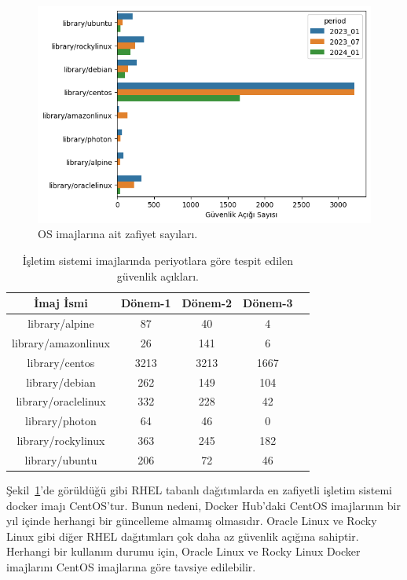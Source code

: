 \begin{figure}
    \centering
    \includegraphics[width=1\linewidth]{images/s2/os-images-by-period.png}
    \caption{OS imajlarına ait zafiyet sayıları.}\label{fig:os-images-by-period}
\end{figure}

\begin{table}
    \centering
    \begin{tabular}{ |c|c|c|c|c| }
        \hline
        İmaj İsmi & Dönem-1 & Dönem-2 & Dönem-3 \\
        \hline
        library/alpine      &   87 &   40 & 4 \\
        library/amazonlinux &   26 &  141 & 6 \\
        library/centos      & 3213 & 3213 & 1667 \\
        library/debian      &  262 &  149 & 104 \\
        library/oraclelinux &  332 &  228 & 42 \\
        library/photon      &   64 &   46 & 0 \\
        library/rockylinux  &  363 &  245 & 182 \\
        library/ubuntu      &  206 &   72 & 46 \\
        \hline
    \end{tabular}
    \caption{İşletim sistemi imajlarında periyotlara göre tespit edilen güvenlik açıkları.}\label{tab:os-images-by-period}
\end{table}

Şekil~\ref{fig:os-images-by-period}'de görüldüğü gibi RHEL tabanlı dağıtımlarda en zafiyetli işletim sistemi docker imajı CentOS'tur. Bunun nedeni, Docker Hub'daki CentOS imajlarının bir yıl içinde herhangi bir güncelleme almamış olmasıdır. Oracle Linux ve Rocky Linux gibi diğer RHEL dağıtımları çok daha az güvenlik açığına sahiptir. Herhangi bir kullanım durumu için, Oracle Linux ve Rocky Linux Docker imajlarını CentOS imajlarına göre tavsiye edilebilir.

